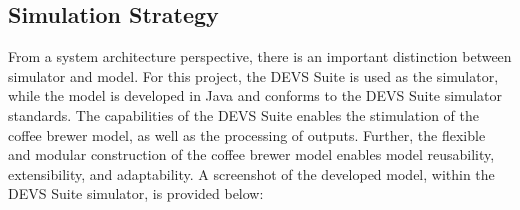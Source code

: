 \documentclass[10pt]{article}
\begin{document}



\subsection{Simulation Strategy}
From a system architecture perspective, there is an important distinction between simulator and model.  For this project, the DEVS Suite is used as the simulator, while the model is developed in Java and conforms to the DEVS Suite simulator standards.  The capabilities of the DEVS Suite enables the stimulation of the coffee brewer model, as well as the processing of outputs.  Further, the flexible and modular construction of the coffee brewer model enables model reusability, extensibility, and adaptability.  A screenshot of the developed model, within the DEVS Suite simulator, is provided below:
\end{document}
